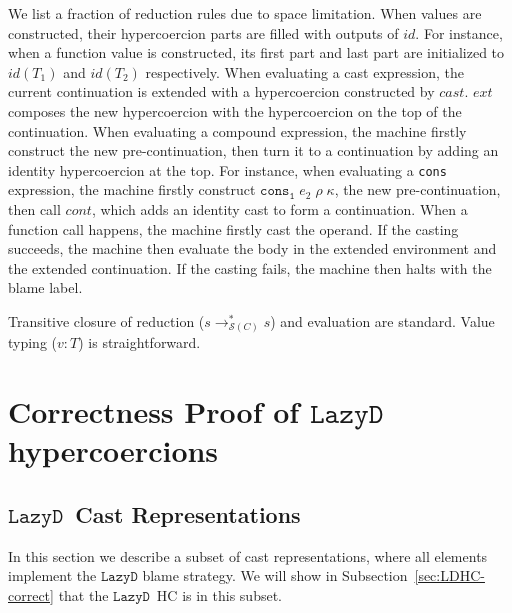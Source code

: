 \documentclass[acmsmall,review,anonymous]{acmart}\settopmatter{printfolios=true,printccs=false,printacmref=false}
\newcommand{\judgeType}[2]{#1 : #2}
\newcommand{\lazyD}{$\mathtt{Lazy D}$}
\newcommand{\hckOOconsI}[3]{\mathtt{cons_1}\;#1\;#2\;#3}
\newcommand{\judgeSreduceTrans}[3]{#2 \longrightarrow_{\mathcal{S}(#1)}^{*} #3}
\begin{document}
We list a fraction of reduction rules due to space limitation.
When values are constructed, their hypercoercion parts are filled with outputs 
of $ id $. For instance, when a function value is constructed, its first part 
and last part are initialized to $ id(T_1) $ and $ id(T_2) $ respectively.
When evaluating a cast expression, the current continuation is extended with a 
hypercoercion constructed by $ cast $. $ ext $ composes the new hypercoercion 
with the hypercoercion on the top of the continuation.
When evaluating a compound expression, the machine firstly construct the new 
pre-continuation, then turn it to a continuation by adding an identity 
hypercoercion at the top. For instance, when evaluating a \texttt{cons} 
expression, the machine firstly construct $ \hckOOconsI{e_2}{\rho}{\kappa} $, 
the new pre-continuation, then call $ cont $, which adds an identity cast to 
form a continuation. 
When a function call happens, the machine firstly cast the operand. If the 
casting succeeds, the machine then evaluate the body in the extended 
environment and the extended continuation. If the casting fails, the machine 
then halts with the blame label.

Transitive closure of reduction ($ \judgeSreduceTrans{C}{s}{s} $) and 
evaluation are standard. Value typing ($ \judgeType{v}{T} $) is straightforward.


\section{Correctness Proof of \lazyD{} hypercoercions}

\subsection{\lazyD\ Cast Representations}

In this section we describe a subset of cast representations, where all 
elements implement the \lazyD{} blame strategy. We will show in 
Subsection~\ref{sec:LDHC-correct} that the \lazyD\ HC is in this subset.
\end{document}
